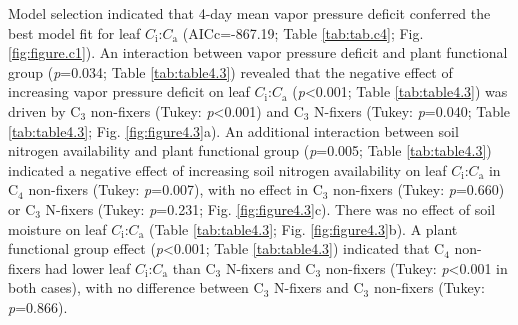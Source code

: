 Model selection indicated that 4-day mean vapor pressure deficit conferred the best model fit for leaf $C_\mathrm{i}$:$C_\mathrm{a}$ (AICc=-867.19; Table \ref{tab:tab.c4}; Fig. \ref{fig:figure.c1}). An interaction between vapor pressure deficit and plant functional group (\textit{p}=0.034; Table \ref{tab:table4.3}) revealed that the negative effect of increasing vapor pressure deficit on leaf $C_\mathrm{i}$:$C_\mathrm{a}$ (\textit{p}<0.001; Table \ref{tab:table4.3}) was driven by C$_3$ non-fixers (Tukey: \textit{p}<0.001) and C$_3$ N-fixers (Tukey: \textit{p}=0.040; Table \ref{tab:table4.3}; Fig. \ref{fig:figure4.3}a). An additional interaction between soil nitrogen availability and plant functional group (\textit{p}=0.005; Table \ref{tab:table4.3}) indicated a negative effect of increasing soil nitrogen availability on leaf $C_\mathrm{i}$:$C_\mathrm{a}$ in C$_4$ non-fixers (Tukey: \textit{p}=0.007), with no effect in C$_3$ non-fixers (Tukey: \textit{p}=0.660) or C$_3$ N-fixers (Tukey: \textit{p}=0.231; Fig. \ref{fig:figure4.3}c). There was no effect of soil moisture on leaf $C_\mathrm{i}$:$C_\mathrm{a}$ (Table \ref{tab:table4.3}; Fig. \ref{fig:figure4.3}b). A plant functional group effect (\textit{p}<0.001; Table \ref{tab:table4.3}) indicated that C$_4$ non-fixers had lower leaf $C_\mathrm{i}$:$C_\mathrm{a}$ than C$_3$ N-fixers and C$_3$ non-fixers (Tukey: \textit{p}<0.001 in both cases), with no difference between C$_3$ N-fixers and C$_3$ non-fixers (Tukey: \textit{p}=0.866).


